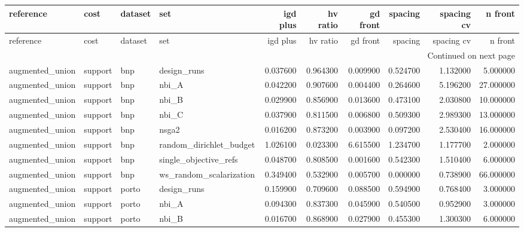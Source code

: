\begin{landscape}
\begin{center}\label{tab:s13lev}\end{center}
\begingroup\tiny\setlength{\tabcolsep}{2.5pt}
\begin{longtable}{llllrrrrrr}
\toprule
reference & cost & dataset & set & igd plus & hv ratio & gd front & spacing & spacing cv & n front \\
\midrule
\endfirsthead
\toprule
reference & cost & dataset & set & igd plus & hv ratio & gd front & spacing & spacing cv & n front \\
\midrule
\endhead
\midrule
\multicolumn{10}{r}{Continued on next page} \\
\midrule
\endfoot
\bottomrule
\endlastfoot
augmented\_union & support & bnp & design\_runs & 0.037600 & 0.964300 & 0.009900 & 0.524700 & 1.132000 & 5.000000 \\
augmented\_union & support & bnp & nbi\_A & 0.042200 & 0.907600 & 0.004400 & 0.264600 & 5.196200 & 27.000000 \\
augmented\_union & support & bnp & nbi\_B & 0.029900 & 0.856900 & 0.013600 & 0.473100 & 2.030800 & 10.000000 \\
augmented\_union & support & bnp & nbi\_C & 0.037900 & 0.811500 & 0.006800 & 0.509300 & 2.989300 & 13.000000 \\
augmented\_union & support & bnp & nsga2 & 0.016200 & 0.873200 & 0.003900 & 0.097200 & 2.530400 & 16.000000 \\
augmented\_union & support & bnp & random\_dirichlet\_budget & 1.026100 & 0.023300 & 6.615500 & 1.234700 & 1.177700 & 2.000000 \\
augmented\_union & support & bnp & single\_objective\_refs & 0.048700 & 0.808500 & 0.001600 & 0.542300 & 1.510400 & 6.000000 \\
augmented\_union & support & bnp & ws\_random\_scalarization & 0.349400 & 0.532900 & 0.005700 & 0.000000 & 0.738900 & 66.000000 \\
augmented\_union & support & porto & design\_runs & 0.159900 & 0.709600 & 0.088500 & 0.594900 & 0.768400 & 3.000000 \\
augmented\_union & support & porto & nbi\_A & 0.094300 & 0.837300 & 0.045900 & 0.540500 & 0.952900 & 3.000000 \\
augmented\_union & support & porto & nbi\_B & 0.016700 & 0.868900 & 0.027900 & 0.455300 & 1.300300 & 6.000000 \\

\end{longtable}
\end{landscape}
